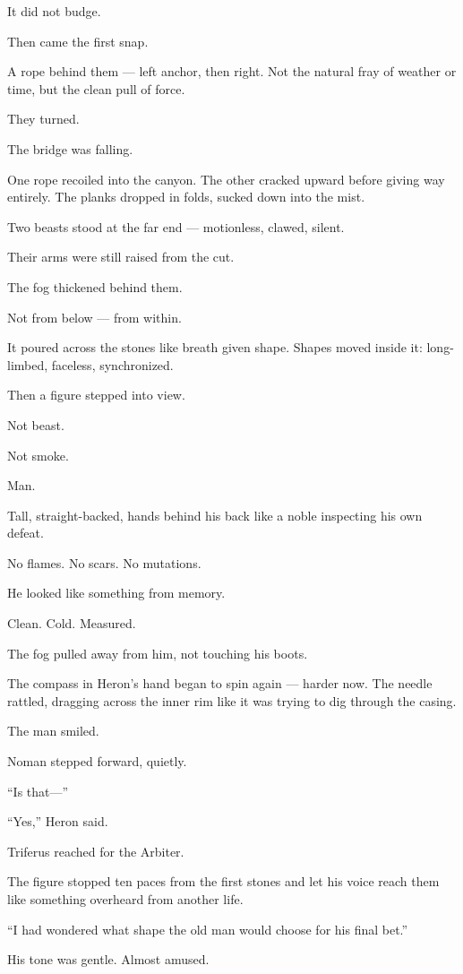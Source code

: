 \documentclass[9pt]{article}
\begin{document}
It did not budge.

Then came the first snap.

A rope behind them — left anchor, then right. Not the natural fray of weather or time, but the clean pull of force.

They turned.

The bridge was falling.

One rope recoiled into the canyon. The other cracked upward before giving way entirely. The planks dropped in folds, sucked down into the mist.

Two beasts stood at the far end — motionless, clawed, silent.

Their arms were still raised from the cut.

\bigskip

The fog thickened behind them.

Not from below — from within.

It poured across the stones like breath given shape. Shapes moved inside it: long-limbed, faceless, synchronized.

Then a figure stepped into view.

Not beast.

Not smoke.

Man.

Tall, straight-backed, hands behind his back like a noble inspecting his own defeat.

No flames. No scars. No mutations.

He looked like something from memory.

Clean. Cold. Measured.

The fog pulled away from him, not touching his boots.

The compass in Heron’s hand began to spin again — harder now. The needle rattled, dragging across the inner rim like it was trying to dig through the casing.

The man smiled.

Noman stepped forward, quietly.

“Is that—”

“Yes,” Heron said.

Triferus reached for the Arbiter.

The figure stopped ten paces from the first stones and let his voice reach them like something overheard from another life.

“I had wondered what shape the old man would choose for his final bet.”

His tone was gentle. Almost amused.
\end{document}

